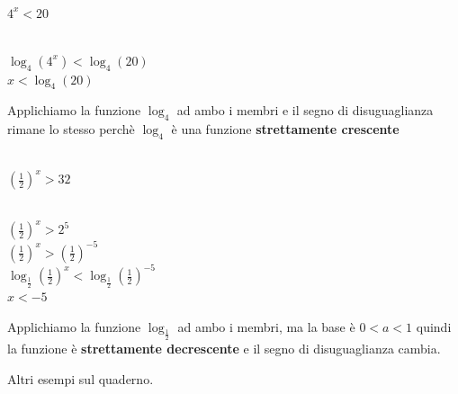 \documentclass[12pt]{report}
\newcounter{exercise}
\begin{document}
	\begin{assignment}{}{} \quad \\
		$4^x < 20$
		\begin{exercise}{}{} \quad \\
			$\log_4(4^x) < \log_4(20)$ \\
			$x < \log_4(20)$
		\end{exercise}
		Applichiamo la funzione $\log_4$ ad ambo i membri e il segno di disuguaglianza rimane lo stesso perchè $\log_4$ è una funzione \textbf{strettamente crescente}
	\end{assignment}

	\begin{assignment}{}{} \quad \\
		$(\frac{1}{2})^x > 32$
		\begin{exercise}{}{} \quad \\
			$(\frac{1}{2})^x > 2^5$ \\
			$(\frac{1}{2})^x > (\frac{1}{2})^{-5}$ \\
			$\log_{\frac{1}{2}}(\frac{1}{2})^x < \log_{\frac{1}{2}}(\frac{1}{2})^{-5}$ \\
			$x < -5$
		\end{exercise}
		Applichiamo la funzione $\log_\frac{1}{2}$ ad ambo i membri, ma la base è $0 < a < 1$ quindi la funzione è \textbf{strettamente decrescente} e il segno di disuguaglianza cambia.
	\end{assignment}
	Altri esempi sul quaderno.
\end{document}
